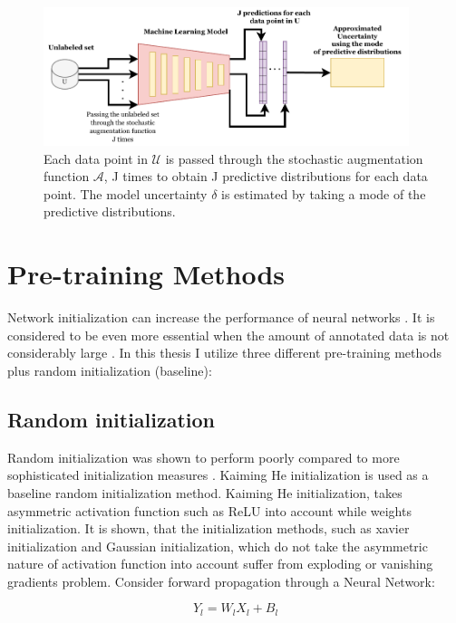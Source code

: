 \begin{figure}[htbp]
\centering
\captionsetup{format=plain}
\includegraphics[keepaspectratio,width=0.95\textwidth]{figures/fig_augmentations_based.pdf}
\caption{Each data point in $\mathcal{U}$ is passed through the stochastic augmentation function $\mathcal{A}$, J times to obtain J predictive distributions for each data point. The model uncertainty $\delta$ is estimated by taking a mode of the predictive distributions.}
\label{fig:augmentations_based}
\end{figure}

\section{Pre-training Methods}\label{section:pretraining_methods}
Network initialization can increase the performance of neural networks \cite{hanin2018}. It is considered to be even more essential when the amount of annotated data is not considerably large \cite{holmberg2020}. In this thesis I utilize three different pre-training methods plus random initialization (baseline):

\subsection{Random initialization}
Random initialization was shown to perform poorly compared to more sophisticated initialization measures \cite{glorot2010}. Kaiming He initialization \cite{he2015} is used as a baseline random initialization method. Kaiming He initialization, takes asymmetric activation function such as ReLU into account while weights initialization. It is shown\cite{he2015}, that the initialization methods, such as xavier initialization\cite{glorot2010} and Gaussian initialization, which do not take the asymmetric nature of activation function into account suffer from exploding or vanishing gradients problem. Consider forward propagation through a Neural Network:

\begin{equation}
    \label{equation:forward_pass}
    Y_l = W_lX_l + B_l
\end{equation}

